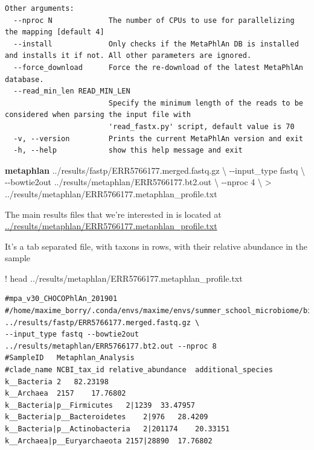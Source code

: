 \documentclass[
  letterpaper,
]{book}
\newenvironment{Shaded}{}{}
\newcommand{\AttributeTok}[1]{\textcolor[rgb]{0.84,0.23,0.29}{#1}}
\newcommand{\DataTypeTok}[1]{\textcolor[rgb]{0.84,0.23,0.29}{#1}}
\newcommand{\ExtensionTok}[1]{\textcolor[rgb]{0.84,0.23,0.29}{\textbf{#1}}}
\newcommand{\NormalTok}[1]{\textcolor[rgb]{0.14,0.16,0.18}{#1}}
\newcommand{\OperatorTok}[1]{\textcolor[rgb]{0.14,0.16,0.18}{#1}}
\begin{document}
\begin{verbatim}
Other arguments:
  --nproc N             The number of CPUs to use for parallelizing the mapping [default 4]
  --install             Only checks if the MetaPhlAn DB is installed and installs it if not. All other parameters are ignored.
  --force_download      Force the re-download of the latest MetaPhlAn database.
  --read_min_len READ_MIN_LEN
                        Specify the minimum length of the reads to be considered when parsing the input file with
                        'read_fastx.py' script, default value is 70
  -v, --version         Prints the current MetaPhlAn version and exit
  -h, --help            show this help message and exit
\end{verbatim}

\begin{Shaded}
\begin{Highlighting}[]
\ExtensionTok{metaphlan}\NormalTok{ ../results/fastp/ERR5766177.merged.fastq.gz  }\DataTypeTok{\textbackslash{}}
    \AttributeTok{{-}{-}input\_type}\NormalTok{ fastq }\DataTypeTok{\textbackslash{}}
    \AttributeTok{{-}{-}bowtie2out}\NormalTok{ ../results/metaphlan/ERR5766177.bt2.out  }\DataTypeTok{\textbackslash{}}
    \AttributeTok{{-}{-}nproc}\NormalTok{ 4 }\DataTypeTok{\textbackslash{}}
    \OperatorTok{\textgreater{}}\NormalTok{ ../results/metaphlan/ERR5766177.metaphlan\_profile.txt}
\end{Highlighting}
\end{Shaded}

The main results files that we're interested in is located at
\url{../results/metaphlan/ERR5766177.metaphlan_profile.txt}

It's a tab separated file, with taxons in rows, with their relative
abundance in the sample

\begin{Shaded}
\begin{Highlighting}[]
\OperatorTok{!}\NormalTok{ head ..}\OperatorTok{/}\NormalTok{results}\OperatorTok{/}\NormalTok{metaphlan}\OperatorTok{/}\NormalTok{ERR5766177.metaphlan\_profile.txt}
\end{Highlighting}
\end{Shaded}

\begin{verbatim}
#mpa_v30_CHOCOPhlAn_201901
#/home/maxime_borry/.conda/envs/maxime/envs/summer_school_microbiome/bin/metaphlan ../results/fastp/ERR5766177.merged.fastq.gz \
--input_type fastq --bowtie2out ../results/metaphlan/ERR5766177.bt2.out --nproc 8
#SampleID   Metaphlan_Analysis
#clade_name NCBI_tax_id relative_abundance  additional_species
k__Bacteria 2   82.23198
k__Archaea  2157    17.76802
k__Bacteria|p__Firmicutes   2|1239  33.47957
k__Bacteria|p__Bacteroidetes    2|976   28.4209
k__Bacteria|p__Actinobacteria   2|201174    20.33151
k__Archaea|p__Euryarchaeota 2157|28890  17.76802
\end{verbatim}
\end{document}
